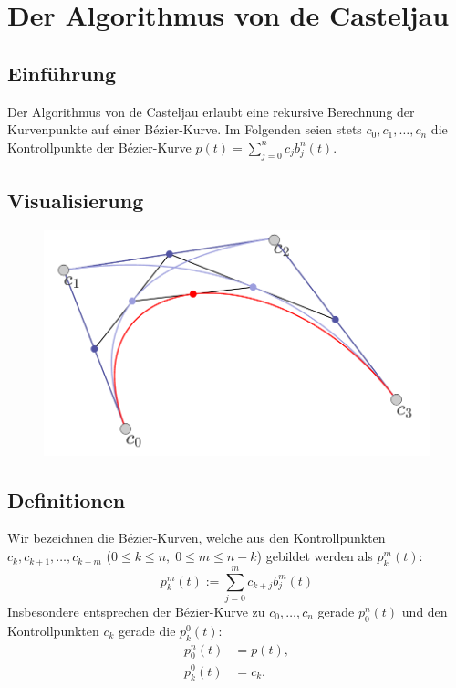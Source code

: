 \documentclass{mywork}
\begin{document}
\section*{Der Algorithmus von de Casteljau}


\subsection*{Einführung}

Der Algorithmus von de Casteljau erlaubt eine rekursive Berechnung der Kurvenpunkte auf einer Bézier-Kurve.
Im Folgenden seien stets $c_0, c_1, \dotsc, c_n$ die Kontrollpunkte der Bézier-Kurve $p(t) = \sum_{j=0}^n c_j b_j^n(t)$.

\subsection*{Visualisierung}

\begin{figure}[h]
	\centering
	\includegraphics[scale=0.3]{casteljau.png}
\end{figure}

\subsection*{Definitionen}

Wir bezeichnen die Bézier-Kurven, welche aus den Kontrollpunkten $c_k, c_{k+1}, \dotsc, c_{k+m}$ ($0\le k \le n, \; 0 \le m \le n - k$) gebildet werden als $p_k^m(t)$:
\[
	p_k^m(t) := \sum_{j=0}^m c_{k+j} b_j^m(t)
\]
Insbesondere entsprechen der Bézier-Kurve zu $c_0, \dotsc, c_n$ gerade $p_0^n(t)$ und den Kontrollpunkten $c_k$ gerade die $p_k^0(t)$:
\begin{align*}
	p_0^n(t) &= p(t), \\
	p_k^0(t) &= c_k.
\end{align*}
\end{document}
